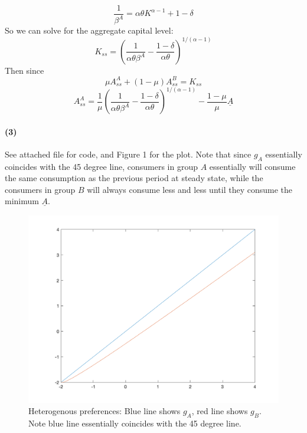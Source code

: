 \documentclass[10pt,letter]{article}
\newcommand{\problempart}[1]{\paragraph{#1}}
\begin{document}
\[ \frac{1}{\beta^A} = \alpha \theta K^{\alpha-1} + 1-\delta \]
So we can solve for the aggregate capital level:
\[ K_{ss} = \left(\frac{1}{\alpha\theta \beta^A} - \frac{1-\delta}{\alpha\theta}\right)^{1/(\alpha-1)}  \]
Then since
\[ \mu A^A_{ss} + (1-\mu)A^B_{ss} = K_{ss} \]
\[ A^A_{ss} = \frac{1}{\mu}\left(\frac{1}{\alpha\theta \beta^A} - \frac{1-\delta}{\alpha\theta}\right)^{1/(\alpha-1)} - \frac{1-\mu}{\mu}\underline{A} \]
\problempart{(3)} See attached file for code, and Figure 1 for the plot. Note that since $g_A$ essentially coincides with the  45 degree line, consumers in group $A$ essentially will consume the same consumption as the previous period at steady state, while the consumers in group $B$ will always consume less and less until they consume the minimum $\underline{A}$.

\begin{figure}
\includegraphics[scale=0.8]{ps4q1}
\caption{Heterogenous preferences: Blue line shows $g_A$, red line shows $g_B$. Note blue line essentially coincides with the 45 degree line.}
\end{figure}
\end{document}

